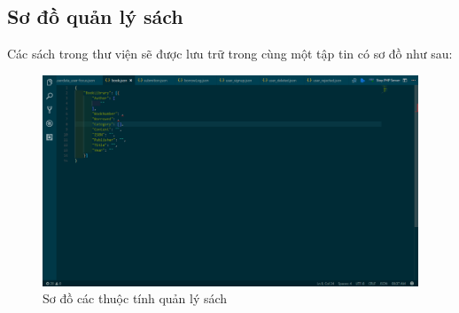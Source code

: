 \documentclass[12pt,a4paper]{report}
\begin{document}
		\subsection{Sơ đồ quản lý sách}
		Các sách trong thư viện sẽ được lưu trữ trong cùng một tập tin có sơ đồ như sau:
			\begin{figure}[H]
				\centering

				\label{F:book}
				\includegraphics[scale = .3]{book.png}
				\caption{Sơ đồ các thuộc tính quản lý sách}
			\end{figure}
\end{document}
